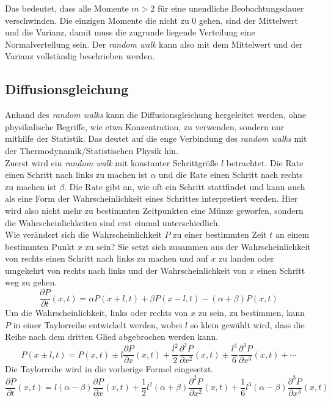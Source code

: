 Das bedeutet, dass alle Momente $m > 2$ für eine unendliche Beobachtungsdauer verschwinden. Die einzigen Momente die nicht zu $0$ gehen, sind der Mittelwert und die Varianz, damit muss die zugrunde liegende Verteilung eine Normalverteilung sein. Der \emph{random walk} kann also mit dem Mittelwert und der Varianz vollständig beschrieben werden.

\subsection*{Diffusionsgleichung}
Anhand des \emph{random walks} kann die Diffusionsgleichung hergeleitet werden, ohne physikalische Begriffe, wie etwa Konzentration, zu verwenden, sondern nur mithilfe der Statistik. Das deutet auf die enge Verbindung des \emph{random walks} mit der Thermodynamik/Statistischen Physik hin.\\
Zuerst wird ein \emph{random walk} mit konstanter Schrittgröße $l$ betrachtet. Die Rate einen Schritt nach links zu machen ist $\alpha$ und die Rate einen Schritt nach rechts zu machen ist $\beta$. Die Rate gibt an, wie oft ein Schritt stattfindet und kann auch als eine Form der Wahrscheinlichkeit eines Schrittes interpretiert werden. Hier wird also nicht mehr zu bestimmten Zeitpunkten eine Münze geworfen, sondern die Wahrscheinlichkeiten sind erst einmal unterschiedlich.\\ Wie verändert sich die Wahrscheinlichkeit $P$ zu einer bestimmten Zeit $t$ an einem bestimmten Punkt $x$ zu sein? Sie setzt sich zusammen aus der Wahrscheinlichkeit von rechts einen Schritt nach links zu machen und auf $x$ zu landen oder umgekehrt von rechts nach links und der Wahrscheinlichkeit von $x$ einen Schritt weg zu gehen.
\begin{equation}
  \frac{\partial P}{\partial t} (x, t) = \alpha P(x + l, t) + \beta P(x - l, t) - (\alpha + \beta) P(x, t)
\end{equation}
Um die Wahrscheinlichkeit, links oder rechts von $x$ zu sein, zu bestimmen,  kann $P$ in einer Taylorreihe entwickelt werden, wobei $l$ so klein gewählt wird, dass die Reihe nach dem dritten Glied abgebrochen werden kann.
\begin{equation}
  P(x \pm l, t) = P(x, t) \pm l \frac{\partial P}{\partial x}(x, t) + \frac{l^2}{2} \frac{\partial^2 P}{\partial x^2}(x, t) \pm \frac{l^3}{6} \frac{\partial^3 P}{\partial x^3}(x, t) + \cdots
\end{equation}
Die Taylorreihe wird in die vorherige Formel eingesetzt.
\begin{equation}
  \frac{\partial P}{\partial t} (x, t) = l (\alpha - \beta) \frac{\partial P}{\partial x}(x, t) + \frac{1}{2} l^2 (\alpha + \beta) \frac{\partial^2 P}{\partial x^2}(x, t) + \frac{1}{6} l^3 (\alpha - \beta) \frac{\partial^3 P}{\partial x^3}(x, t)
\end{equation}
